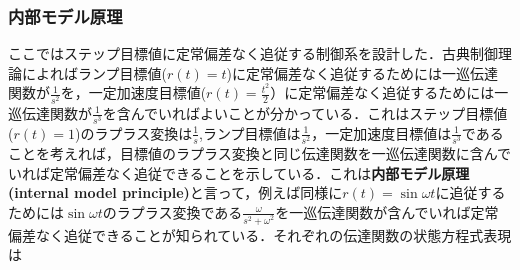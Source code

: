 \subsubsection{内部モデル原理}

ここではステップ目標値に定常偏差なく追従する制御系を設計した．古典制御理論によればランプ目標値($r(t)=t$)に定常偏差なく追従するためには一巡伝達関数が$\frac{1}{s^2}$を，一定加速度目標値($r(t)=\frac{t^2}{2}$）に定常偏差なく追従するためには一巡伝達関数が$\frac{1}{s^3}$を含んでいればよいことが分かっている．これはステップ目標値($r(t)=1$)のラプラス変換は$\frac{1}{s}$,ランプ目標値は$\frac{1}{s^2}$，一定加速度目標値は$\frac{1}{s^3}$であることを考えれば，目標値のラプラス変換と同じ伝達関数を一巡伝達関数に含んでいれば定常偏差なく追従できることを示している．これは{\bf 内部モデル原理(internal model principle)}と言って，例えば同様に$r(t)= \sin \omega t$に追従するためには$\sin \omega t$のラプラス変換である$\frac{\omega}{s^2 + \omega^2}$を一巡伝達関数が含んでいれば定常偏差なく追従できることが知られている．それぞれの伝達関数の状態方程式表現は
